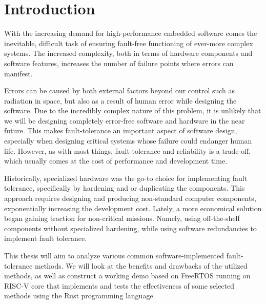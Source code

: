 \section{Introduction}

With the increasing demand for high-performance embedded software comes the inevitable, difficult task of ensuring fault-free functioning of ever-more complex systems. The increased complexity, both in terms of hardware components and software features, increases the number of failure points where errors can manifest.

Errors can be caused by both external factors beyond our control such as radiation in space, but also as a result of human error while designing the software. Due to the incredibly complex nature of this problem, it is unlikely that we will be designing completely error-free software and hardware in the near future. This makes fault-tolerance an important aspect of software design, especially when designing critical systems whose failure could endanger human life. However, as with most things, fault-tolerance and reliability is a trade-off, which usually comes at the cost of performance and development time.

Historically, specialized hardware was the go-to choice for implementing fault tolerance, specifically by hardening and or duplicating the components. This approach requires designing and producing non-standard computer components, exponentially increasing the development cost. Lately, a more economical solution began gaining traction for non-critical missions. Namely, using off-the-shelf components without specialized hardening, while using software redundancies to implement fault tolerance.

This thesis will aim to analyze various common software-implemented fault-tolerance methods. We will look at the benefits and drawbacks of the utilized methods, as well as construct a working demo based on FreeRTOS running on RISC-V core that implements and tests the effectiveness of some selected methods using the Rust programming language.
